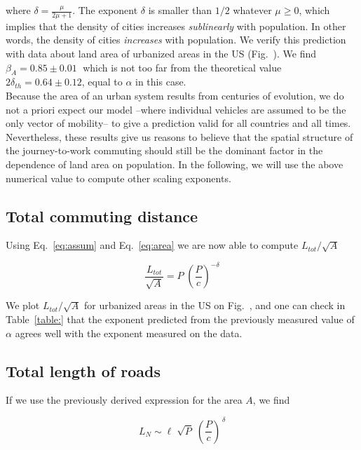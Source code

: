 where $\delta=\frac{\mu}{2\mu+1}$. The exponent $\delta$ is smaller than $1/2$
whatever $\mu\geq 0$, which implies that the density of cities increases
\emph{sublinearly} with population. In other words, the density of cities
\emph{increases}  with population. We verify this prediction with
data about land area of urbanized areas in the US (Fig.~\cite{fig:scaling_area}). We find
$\beta_A = 0.85 \pm 0.01\;$ which is not too far from the
theoretical value $2\delta_{th} = 0.64 \pm 0.12$, equal to
$\alpha$ in this case.\\

Because the area of an urban system results from centuries of evolution, we do
not a priori expect our model --where individual vehicles are assumed to be the
only vector of mobility-- to give a prediction valid for all countries and all
times. Nevertheless, these results give us reasons to believe that the spatial
structure of the journey-to-work commuting should still be the dominant factor
in the dependence of land area on population. In the following, we will use the
above numerical value to compute other scaling exponents.


\subsection{Total commuting distance}

Using Eq.~\ref{eq:assum} and Eq.~\ref{eq:area} we are now able to compute $L_{tot}/\sqrt{A}$

\begin{equation}
    \frac{L_{tot}}{\sqrt{A}} = P\; \left(\frac{P}{c}\right)^{-\delta}
    \label{eq:travelled_length}
\end{equation}

We plot $L_{tot} / \sqrt{A}$ for urbanized areas in the US on
Fig.~\cite{fig:scaling_Ltot_norm}, and one
can check in Table~\ref{table:} that the exponent predicted from the previously measured
value of $\alpha$ agrees well with the exponent measured on the data.


\subsection{Total length of roads}

If we use the previously derived expression for the area $A$, we find

\begin{equation}
    L_N \sim \ell \; \sqrt{P}\; \left(\frac{P}{c}\right)^{\,\delta}
\end{equation}

